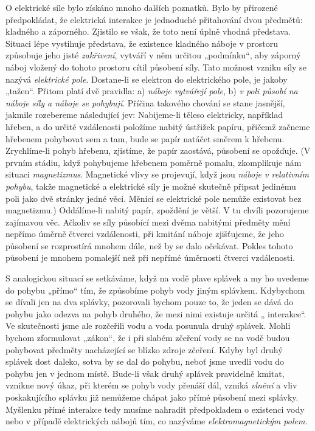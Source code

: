     O elektrické síle bylo získáno mnoho dalších poznatků. Bylo by přirozené předpokládat, že 
    elektrická interakce je jednoduché přitahování dvou předmětů: kladného a záporného. Zjistilo se 
    však, že toto není úplně vhodná představa. Situaci lépe vystihuje představa, že existence 
    kladného náboje v prostoru způsobuje jeho jisté \emph{zakřivení}, vytváří v něm určitou 
    „podmínku“, aby záporný náboj vložený do tohoto prostoru cítil působení síly. Tato možnost 
    vzniku síly se nazývá \emph{elektrické pole}. Dostane-li se elektron do elektrického pole, je 
    jakoby „tažen“. Přitom platí dvě pravidla: a) \emph{náboje vytvářejí pole}, b) \emph{v poli 
    působí na náboje síly a náboje se pohybují}. Příčina takového chování se stane jasnější, 
    jakmile rozebereme následující jev: Nabijeme-li těleso elektricky, například hřeben, a do 
    určité vzdálenosti položíme nabitý ústřižek papíru, přičemž začneme hřebenem pohybovat sem a 
    tam, bude se papír natáčet směrem k hřebenu. Zrychlíme-li pohyb hřebenu, zjistíme, že papír 
    zaostává, působení se opožďuje. (V prvním stádiu, když pohybujeme hřebenem poměrně 
    pomalu, zkomplikuje nám situaci \emph{magnetizmus}. Magnetické vlivy se projevují, když jsou 
    \emph{náboje v relativním pohybu}, takže magnetické a elektrické síly je možné skutečně připsat 
    jedinému poli jako dvě stránky jedné věci. Měnící se elektrické pole nemůže existovat bez 
    magnetizmu.) Oddálíme-li nabitý papír, zpoždění je větší. V tu chvíli pozorujeme zajímavou věc. 
    Ačkoliv se síly působící mezi dvěma nabitými předměty mění nepřímo úměrně čtverci vzdálenosti, 
    při kmitání náboje zjišťujeme, že jeho působení se rozprostírá mnohem dále, než by se dalo 
    očekávat. Pokles tohoto působení je mnohem pomalejší než při nepřímé úměrnosti čtverci 
    vzdálenosti.
    
    S analogickou situací se setkáváme, když na vodě plave splávek a my ho uvedeme do pohybu 
    „přímo“ tím, že způsobíme pohyb vody jiným splávkem. Kdybychom se dívali jen na dva splávky, 
    pozorovali bychom pouze to, že jeden se dává do pohybu jako odezva na pohyb druhého, že mezi 
    nimi existuje určitá „  interakce“. Ve skutečnosti jsme ale rozčeřili vodu a voda posunula 
    druhý splávek. Mohli bychom zformulovat „zákon“, že i při slabém zčeření vody se na vodě budou 
    pohybovat předměty nacházející se blízko zdroje zčeření. Kdyby byl druhý splávek dost daleko, 
    sotva by se dal do pohybu, neboť jsme uvedli vodu do pohybu jen v jednom místě. Bude-li však 
    druhý splávek pravidelně kmitat, vznikne nový úkaz, při kterém se pohyb vody přenáší dál, 
    vzniká \emph{vlnění} a vliv poskakujícího splávku již nemůžeme chápat jako přímé působení mezi 
    splávky. Myšlenku přímé interakce tedy musíme nahradit předpokladem o existenci vody nebo v 
    případě elektrických nábojů tím, co nazýváme \emph{elektromagnetickým polem}.
    
